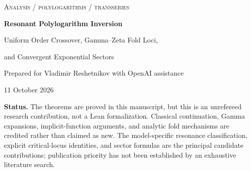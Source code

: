 \documentclass[11pt,a4paper]{article}
\numberwithin{equation}{section}
\theoremstyle{definition}\newtheorem{definition}[theorem]{Definition}
\theoremstyle{remark}\newtheorem{remark}[theorem]{Remark}
\DeclareMathOperator{\Li}{Li}
\newcommand{\A}{\mathcal A}\newcommand{\E}{\mathcal E}
\begin{document}
\begin{center}
{\small\scshape Analysis / polylogarithms / transseries}\par\vspace{10pt}
{\LARGE\bfseries Resonant Polylogarithm Inversion}\par\vspace{7pt}
{\Large Uniform Order Crossover, Gamma--Zeta Fold Loci,\par and Convergent Exponential Sectors}\par\vspace{14pt}
{\normalsize Prepared for Vladimir Reshetnikov with OpenAI assistance}\par
{\small 11 October 2026}\par
\end{center}
\begin{abstract}
The familiar expansion of a polylogarithm at its unit argument is not a
uniform inverse expansion when its order approaches an integer. We retain
the cancelling Gamma and zeta poles as one holomorphic block, derive every
integer-order logarithmic jet, and construct a convergent inverse chart in
three small variables. The chart's crossover function is
$\A(\lambda)=(1-e^{-\lambda})/\lambda$; its nonzero complex zeros require a
different scaling.

At these zeros we obtain an exact Gamma--zeta formula for the critical locus
of the singular core at every integer order, and compute the first
analytic-tail deformation of that locus. The dilogarithm is exceptional:
its undetuned secondary resonance is already a fold. If
$y=e^{-X}$, $\lambda_k=2\pi i k\ne0$, and $\eps=\lambda_k/X$, the equation
$\zeta(2+\eps)-\Li_{2+\eps}(e^{-t})=y$ has two roots near $t=y$, with
$t/y=1\pm\sqrt{-2K\lambda_k/X}+O(X^{-1})$. Here
$K=\gamma_1+((\gamma-1)^2+\zeta(2)+1)/2>0$.
We give the next coefficients, a convergent two-generator transseries,
the leading coefficient of every exponential sector, and a moving-fold
normal form with local branch interchange. Finite residue formulas determine
all chart coefficients from finite Taylor data. Proofs, executable exact
checks, independent floating-point comparisons, an audit of the inspected
repository material, and further research questions are included.
\end{abstract}
\noindent\textbf{Status.} The theorems are proved in this manuscript, but this is
an unrefereed research contribution, not a Lean formalization. Classical
continuation, Gamma expansions, implicit-function arguments, and analytic
fold mechanisms are credited rather than claimed as new. The model-specific
resonance classification, explicit critical-locus identities, and sector
formulas are the principal candidate contributions; publication priority has
not been established by an exhaustive literature search.
\clearpage
\begingroup
\small
\setlength{\parskip}{0pt}
\tableofcontents
\endgroup
\clearpage
\end{document}
